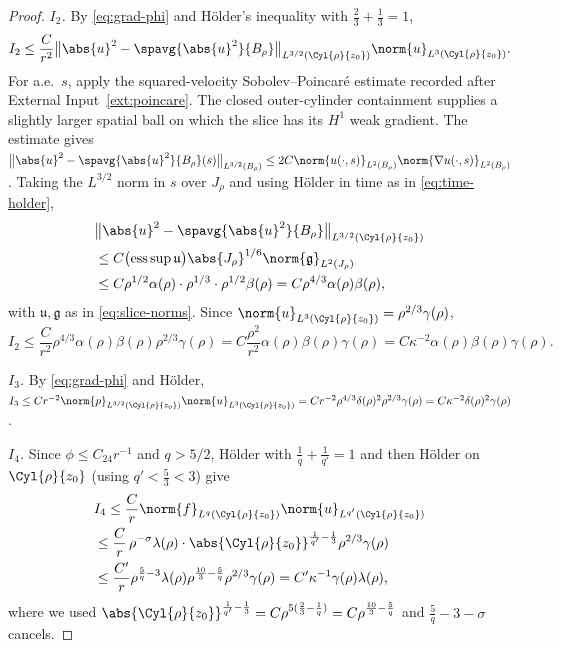 \documentclass[11pt,reqno]{amsart}
\begin{document}
\begin{proof}
\emph{$I_{2}$.} By \eqref{eq:grad-phi} and H\"older's inequality with
$\tfrac23+\tfrac13=1$,
\[
  I_{2}\le\frac{C}{r^{2}}
    \bigl\|\abs{u}^{2}-\spavg{\abs{u}^{2}}{B_{\rho}}\bigr\|_{L^{3/2}(\Cyl{\rho}{z_{0}})}
    \norm{u}_{L^{3}(\Cyl{\rho}{z_{0}})} .
\]
For a.e.\ $s$, apply the squared-velocity Sobolev--Poincar\'e estimate
recorded after External Input~\ref{ext:poincare}. The closed outer-cylinder
containment supplies a slightly larger spatial ball on which the slice
has its $H^1$ weak gradient. The estimate gives
$\bigl\|\abs{u}^{2}-\spavg{\abs{u}^{2}}{B_{\rho}}(s)\bigr\|_{L^{3/2}(B_{\rho})}
 \le2C\norm{u(\cdot,s)}_{L^{2}(B_{\rho})}\norm{\nabla u(\cdot,s)}_{L^{2}(B_{\rho})}$.
Taking the $L^{3/2}$ norm in $s$ over $J_{\rho}$ and using H\"older in time as
in \eqref{eq:time-holder},
\[\begin{aligned}
  &\bigl\|\abs{u}^{2}-\spavg{\abs{u}^{2}}{B_{\rho}}\bigr\|_{L^{3/2}(\Cyl{\rho}{z_{0}})}
  \\ &\le C\bigl(\operatorname*{ess\,sup}\mathfrak{u}\bigr)
     \abs{J_{\rho}}^{1/6}\norm{\mathfrak{g}}_{L^{2}(J_{\rho})}
  \\ &\le C\rho^{1/2}\alpha(\rho)\cdot\rho^{1/3}\cdot\rho^{1/2}\beta(\rho)
  = C\rho^{4/3}\alpha(\rho)\beta(\rho),
\end{aligned}\]
with $\mathfrak{u},\mathfrak{g}$ as in \eqref{eq:slice-norms}. Since
$\norm{u}_{L^{3}(\Cyl{\rho}{z_{0}})}=\rho^{2/3}\gamma(\rho)$,
\[
  I_{2}\le\frac{C}{r^{2}}\rho^{4/3}\alpha(\rho)\beta(\rho)\rho^{2/3}\gamma(\rho)
  =C\frac{\rho^{2}}{r^{2}}\alpha(\rho)\beta(\rho)\gamma(\rho)
  =C\kappa^{-2}\alpha(\rho)\beta(\rho)\gamma(\rho).
\]

\emph{$I_{3}$.} By \eqref{eq:grad-phi} and H\"older,
$I_{3}\le Cr^{-2}\norm{p}_{L^{3/2}(\Cyl{\rho}{z_{0}})}\norm{u}_{L^{3}(\Cyl{\rho}{z_{0}})}
 =Cr^{-2}\rho^{4/3}\delta(\rho)^{2}\rho^{2/3}\gamma(\rho)
 =C\kappa^{-2}\delta(\rho)^{2}\gamma(\rho)$.

\emph{$I_{4}$.} Since $\phi\le C_{24}r^{-1}$ and $q>5/2$, H\"older with
$\tfrac1q+\tfrac1{q'}=1$ and then H\"older on $\Cyl{\rho}{z_{0}}$ (using
$q'<\tfrac53<3$) give
\[\begin{aligned}
  &I_{4}\le\frac{C}{r}\norm{f}_{L^{q}(\Cyl{\rho}{z_{0}})}\norm{u}_{L^{q'}(\Cyl{\rho}{z_{0}})}
  \\ &\le\frac{C}{r}\,\rho^{-\sigma}\lambda(\rho)\cdot
     \abs{\Cyl{\rho}{z_{0}}}^{\frac1{q'}-\frac13}\rho^{2/3}\gamma(\rho)
  \\ &\le\frac{C'}{r}\rho^{\frac5q-3}\lambda(\rho)\rho^{\frac{10}{3}-\frac5q}\rho^{2/3}\gamma(\rho)
  =C'\kappa^{-1}\gamma(\rho)\lambda(\rho),
\end{aligned}\]
where we used $\abs{\Cyl{\rho}{z_{0}}}^{\frac1{q'}-\frac13}
 =C\rho^{5(\frac23-\frac1q)}=C\rho^{\frac{10}3-\frac5q}$ and
$\tfrac5q-3-\sigma$ cancels.


\end{proof}
\end{document}
